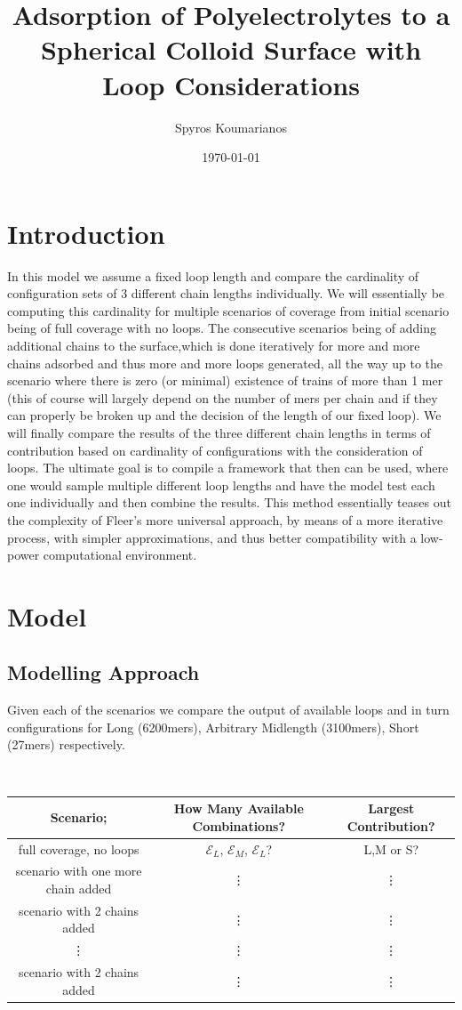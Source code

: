 \documentclass[10pt,letterpaper]{article}
\title{Adsorption of Polyelectrolytes to a Spherical Colloid Surface with Loop Considerations}
\author{Spyros Koumarianos}
\date{\today}
\begin{document}
\maketitle

\newpage
\section{Introduction}

In this model we assume a fixed loop length and compare the cardinality of configuration sets of 3 different chain lengths individually. We will essentially be computing this cardinality for multiple scenarios of coverage from initial scenario being of full coverage with no loops. The consecutive scenarios being of adding additional chains to the surface,which is done iteratively for more and more chains adsorbed and thus more and more loops generated, all the way up to the scenario where there is zero (or minimal) existence of trains of more than 1 mer (this of course will largely depend on the number of mers per chain and if they can properly be broken up and the decision of the length of our fixed loop). We will finally compare the results of the three different chain lengths in terms of contribution based on cardinality of configurations with the consideration of loops. The ultimate goal is to compile a framework that then can be used, where one would sample multiple different loop lengths and have the model test each one individually and then combine the results. This method essentially teases out the complexity of Fleer's more universal approach, by means of a more iterative process, with simpler approximations, and thus better compatibility with a low-power computational environment.


\section{Model}

\subsection{Modelling Approach}

\noindent Given each of the scenarios we compare the output of available loops and in turn configurations for Long (6200mers), Arbitrary Midlength (3100mers), Short (27mers) respectively.

\text{}\\
\begin{tabular}{c|c|c}
	Scenario;  & How Many Available Combinations? & Largest Contribution? \\ 
	\hline
	full coverage, no loops & $\mathcal{E}_{L}$, $\mathcal{E}_{M}$, $\mathcal{E}_{L}$? & L,M or S?\\ 
	scenario with one more chain added & \vdots & \vdots\\
	scenario with 2 chains added &  \vdots & \vdots\\
	\vdots & \vdots & \vdots\\
	scenario with 2 chains added & \vdots & \vdots\\
	\hline 
\end{tabular}
\newline\newline
\end{document}
